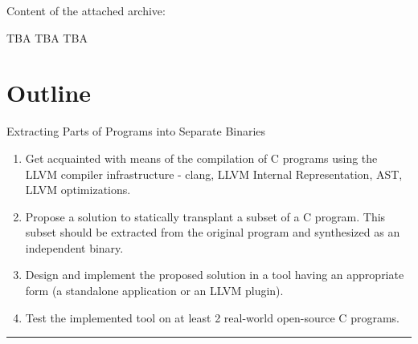 \documentclass[12pt, twoside]{fithesis2}
\renewcommand{\_}{\leavevmode \kern0.07em\vbox{\hrule width0.4em}}
\newenvironment{myEnumerate}{
  \begin{enumerate}[
    leftmargin=2em,
    rightmargin=1em,
    itemsep=\parskip,
    parsep=0em,
    topsep=0em,
    partopsep=0em
]
}{
  \end{enumerate}
}
\begin{document}
Content of the attached archive:

TBA TBA TBA

\chapter{Outline}

Extracting Parts of Programs into Separate Binaries

\begin{myEnumerate}
\item Get acquainted with means of the compilation of C programs using the LLVM
compiler infrastructure - clang, LLVM Internal Representation, AST, LLVM
optimizations.
\item Propose a solution to statically transplant a subset of a C program. This
subset should be extracted from the original program and synthesized as an
independent binary.
\item Design and implement the proposed solution in a tool having an
appropriate form (a standalone application or an LLVM plugin).
\item Test the implemented tool on at least 2 real-world open-source C
programs.
\end{myEnumerate}

\noindent\rule{\textwidth}{1pt}
\end{document}
